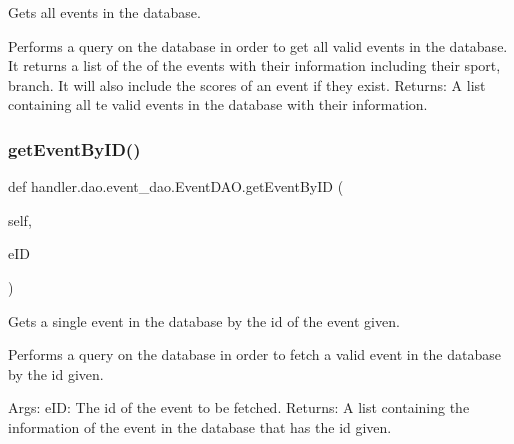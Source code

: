 \begin{DoxyVerb}Gets all events in the database.

Performs a query on the database in order to get all
valid events in the database. It returns a list of the
of the events with their information including their 
sport, branch. It will also include the scores of an 
event if they exist.
Returns:
    A list containing  all te valid events in the
    database  with their information.
\end{DoxyVerb}
 \mbox{\label{classhandler_1_1dao_1_1event__dao_1_1_event_d_a_o_a2d55d30055e25d450c1f2833143e4f39}} 
\subsubsection{\texorpdfstring{get\+Event\+By\+I\+D()}{getEventByID()}}
{\footnotesize\ttfamily def handler.\+dao.\+event\+\_\+dao.\+Event\+D\+A\+O.\+get\+Event\+By\+ID (\begin{DoxyParamCaption}\item[{}]{self,  }\item[{}]{e\+ID }\end{DoxyParamCaption})}

\begin{DoxyVerb}Gets a single event in the database by the 
id of the event given.

Performs a query on the database in order to fetch
a valid event in the database by the id given.

Args:
    eID: The id of the event to be fetched.
Returns:
    A list containing the information of the event in 
    the database that has the id given.
\end{DoxyVerb}
 \mbox{\label{classhandler_1_1dao_1_1event__dao_1_1_event_d_a_o_a9a546a3f9f5a5fff3bece5d2f7bc4ec1}} 
